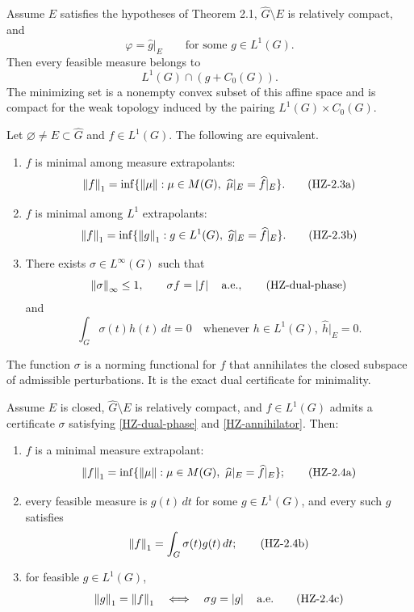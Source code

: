 \begin{corollary}
Assume $E$ satisfies the hypotheses of Theorem 2.1, $\widehat G\setminus E$ is relatively compact, and
\[
  \varphi=\widehat g|_E
  \qquad\text{for some }g\in L^1(G).
\]
Then every feasible measure belongs to
\[
  L^1(G)\cap(g+C_0(G)).
  \tag{HZ-feasible-L1}\label{HZ-feasible-L1}
\]
The minimizing set is a nonempty convex subset of this affine space and is compact for the weak topology induced by the pairing $L^1(G)\times C_0(G)$.
\end{corollary}

\begin{theorem}
Let $\varnothing\ne E\subset\widehat G$ and $f\in L^1(G)$. The following are equivalent.
\begin{enumerate}[label=(\arabic*)]
\item $f$ is minimal among measure extrapolants:
\[
  \left\lVert f\right\rVert_1
  =\inf\{\left\lVert \mu\right\rVert:\mu\in M(G),\ \widehat\mu|_E=\widehat f|_E\}.
  \tag{HZ-2.3a}\label{HZ-2.3a}
\]
\item $f$ is minimal among $L^1$ extrapolants:
\[
  \left\lVert f\right\rVert_1
  =\inf\{\left\lVert g\right\rVert_1:g\in L^1(G),\ \widehat g|_E=\widehat f|_E\}.
  \tag{HZ-2.3b}\label{HZ-2.3b}
\]
\item There exists $\sigma\in L^\infty(G)$ such that
\[
  \left\lVert \sigma\right\rVert_\infty\le1,
  \qquad \sigma f=\left\lvert f\right\rvert\quad\text{a.e.},
  \tag{HZ-dual-phase}\label{HZ-dual-phase}
\]
and
\[
  \int_G\sigma(t)h(t)\,dt=0
  \quad\text{whenever }h\in L^1(G),\ \widehat h|_E=0.
  \tag{HZ-annihilator}\label{HZ-annihilator}
\]
\end{enumerate}
\end{theorem}

The function $\sigma$ is a norming functional for $f$ that annihilates the closed subspace of admissible perturbations. It is the exact dual certificate for minimality.

\begin{corollary}
Assume $E$ is closed, $\widehat G\setminus E$ is relatively compact, and $f\in L^1(G)$ admits a certificate $\sigma$ satisfying \eqref{HZ-dual-phase} and \eqref{HZ-annihilator}. Then:
\begin{enumerate}[label=(\arabic*)]
\item $f$ is a minimal measure extrapolant:
\[
  \left\lVert f\right\rVert_1
  =\inf\{\left\lVert \mu\right\rVert:\mu\in M(G),\ \widehat\mu|_E=\widehat f|_E\};
  \tag{HZ-2.4a}\label{HZ-2.4a}
\]
\item every feasible measure is $g(t)\,dt$ for some $g\in L^1(G)$, and every such $g$ satisfies
\[
  \left\lVert f\right\rVert_1=\int_G\sigma(t)g(t)\,dt;
  \tag{HZ-2.4b}\label{HZ-2.4b}
\]
\item for feasible $g\in L^1(G)$,
\[
  \left\lVert g\right\rVert_1=\left\lVert f\right\rVert_1
  \quad\Longleftrightarrow\quad
  \sigma g=\left\lvert g\right\rvert\quad\text{a.e.}
  \tag{HZ-2.4c}\label{HZ-2.4c}
\]
\end{enumerate}
\end{corollary}

